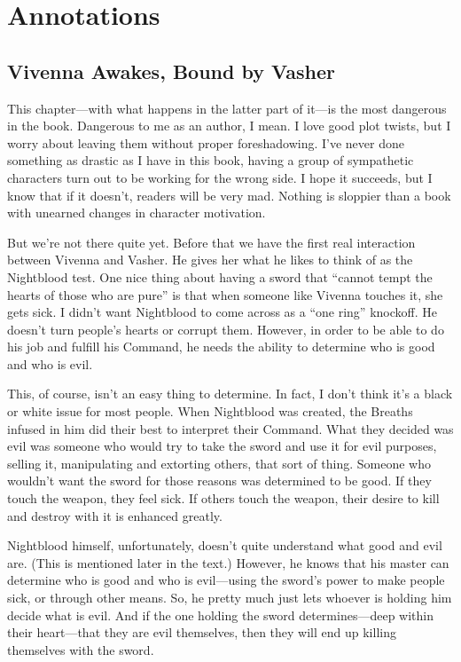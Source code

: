 \section*{Annotations}

\subsection*{Vivenna Awakes, Bound by Vasher}

This chapter—with what happens in the latter part of it—is the most dangerous in the book. Dangerous to me as an author, I mean. I love good plot twists, but I worry about leaving them without proper foreshadowing. I’ve never done something as drastic as I have in this book, having a group of sympathetic characters turn out to be working for the wrong side. I hope it succeeds, but I know that if it doesn’t, readers will be very mad. Nothing is sloppier than a book with unearned changes in character motivation.

But we’re not there quite yet. Before that we have the first real interaction between Vivenna and Vasher. He gives her what he likes to think of as the Nightblood test. One nice thing about having a sword that “cannot tempt the hearts of those who are pure” is that when someone like Vivenna touches it, she gets sick. I didn’t want Nightblood to come across as a “one ring” knockoff. He doesn’t turn people’s hearts or corrupt them. However, in order to be able to do his job and fulfill his Command, he needs the ability to determine who is good and who is evil.

This, of course, isn’t an easy thing to determine. In fact, I don’t think it’s a black or white issue for most people. When Nightblood was created, the Breaths infused in him did their best to interpret their Command. What they decided was evil was someone who would try to take the sword and use it for evil purposes, selling it, manipulating and extorting others, that sort of thing. Someone who wouldn’t want the sword for those reasons was determined to be good. If they touch the weapon, they feel sick. If others touch the weapon, their desire to kill and destroy with it is enhanced greatly.

Nightblood himself, unfortunately, doesn’t quite understand what good and evil are. (This is mentioned later in the text.) However, he knows that his master can determine who is good and who is evil—using the sword’s power to make people sick, or through other means. So, he pretty much just lets whoever is holding him decide what is evil. And if the one holding the sword determines—deep within their heart—that they are evil themselves, then they will end up killing themselves with the sword.

